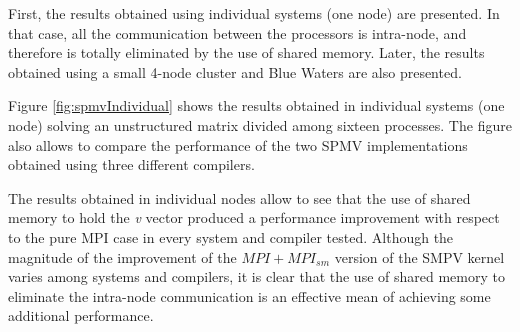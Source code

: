 \medskip

First, the results obtained using individual systems (one node) are presented. In that case, all the communication between the processors is intra-node, and therefore is totally eliminated by the use of shared memory. Later, the results obtained using a small 4-node cluster and Blue Waters are also presented.

\medskip

Figure \ref{fig:spmvIndividual} shows the results obtained in individual systems (one node) solving an unstructured matrix divided among sixteen processes. The figure also allows to compare the performance of the two SPMV implementations obtained using three different compilers. 


\medskip

The results obtained in individual nodes allow to see that the use of shared memory to hold the \emph{v} vector produced a performance improvement with respect to the pure MPI case in every system and compiler tested. Although the magnitude of the improvement of the $MPI+MPI_{sm}$ version of the SMPV kernel varies among systems and compilers, it is clear that the use of shared memory to eliminate the intra-node communication is an effective mean of achieving some additional performance.




